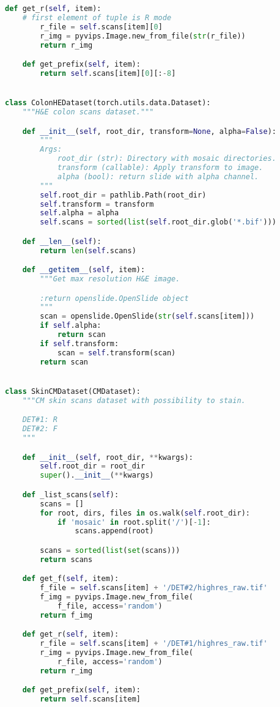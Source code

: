 \documentclass[../main.tex]{subfiles}
\begin{document}
\begin{lstlisting}[language=Python]
    def get_r(self, item):
	# first element of tuple is R mode
        r_file = self.scans[item][0]
        r_img = pyvips.Image.new_from_file(str(r_file))
        return r_img

    def get_prefix(self, item):
        return self.scans[item][0][:-8]


class ColonHEDataset(torch.utils.data.Dataset):
    """H&E colon scans dataset."""

    def __init__(self, root_dir, transform=None, alpha=False):
        """
        Args:
            root_dir (str): Directory with mosaic directories.
            transform (callable): Apply transform to image.
            alpha (bool): return slide with alpha channel.
        """
        self.root_dir = pathlib.Path(root_dir)
        self.transform = transform
        self.alpha = alpha
        self.scans = sorted(list(self.root_dir.glob('*.bif')))

    def __len__(self):
        return len(self.scans)

    def __getitem__(self, item):
        """Get max resolution H&E image.

        :return openslide.OpenSlide object
        """
        scan = openslide.OpenSlide(str(self.scans[item]))
        if self.alpha:
            return scan
        if self.transform:
            scan = self.transform(scan)
        return scan


class SkinCMDataset(CMDataset):
    """CM skin scans dataset with possibility to stain.

    DET#1: R
    DET#2: F
    """

    def __init__(self, root_dir, **kwargs):
        self.root_dir = root_dir
        super().__init__(**kwargs)

    def _list_scans(self):
        scans = []
        for root, dirs, files in os.walk(self.root_dir):
            if 'mosaic' in root.split('/')[-1]:
                scans.append(root)

        scans = sorted(list(set(scans)))
        return scans

    def get_f(self, item):
        f_file = self.scans[item] + '/DET#2/highres_raw.tif'
        f_img = pyvips.Image.new_from_file(
			f_file, access='random')
        return f_img

    def get_r(self, item):
        r_file = self.scans[item] + '/DET#1/highres_raw.tif'
        r_img = pyvips.Image.new_from_file(
			r_file, access='random')
        return r_img

    def get_prefix(self, item):
        return self.scans[item]



\end{lstlisting}
\end{document}
